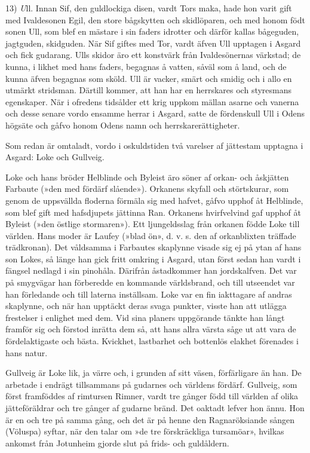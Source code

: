 13) {\emph Ull.} Innan Sif, den guldlockiga disen, vardt Tors maka, hade
hon varit gift med Ivaldesonen Egil, den store bågskytten och
skidlöparen, och med honom födt sonen Ull, som blef en mästare i sin
faders idrotter och därför kallas bågeguden, jagtguden, skidguden. När
Sif giftes med Tor, vardt äfven Ull upptagen i Asgard och fick gudarang.
Ulls skidor äro ett konstvärk från Ivaldesönernas värkstad; de
kunna, i likhet med hans faders, begagnas å vatten, såväl som å land,
och de kunna äfven begagnas som sköld. Ull är vacker, smärt och smidig
och i allo en utmärkt stridsman. Därtill kommer, att han har en
herrskares och styresmans egenskaper. När i ofredens tidsålder ett krig
uppkom mällan asarne och vanerna och desse senare vordo ensamme herrar i
Asgard, satte de fördenskull Ull i Odens högsäte och gåfvo honom Odens
namn och herrskarerättigheter.

Som redan är omtaladt, vordo i oskuldstiden två varelser af jättestam
upptagna i Asgard: Loke och Gullveig.

Loke och hans bröder Helblinde och Byleist äro söner af orkan- och
åskjätten Farbaute (»den med fördärf slående»). Orkanens skyfall och
störtskurar, som genom de uppsvällda floderna förmäla sig med hafvet,
gåfvo upphof åt Helblinde, som blef gift med hafsdjupets jättinna Ran.
Orkanens hvirfvelvind gaf upphof åt Byleist (»den östlige stormaren»).
Ett ljungeldsslag från orkanen födde Loke till världen. Hans moder är
Laufey (»blad ön», d. v. s. den af orkanblixten träffade trädkronan).
Det våldsamma i Farbautes skaplynne visade sig ej på ytan af hans son
Lokes, så länge han gick fritt omkring i Asgard, utan först sedan han
vardt i fängsel nedlagd i sin pinohåla. Därifrån åstadkommer han
jordskalfven. Det var på smygvägar han förberedde en kommande
världsbrand, och till utseendet var han förledande och till laterna
inställsam. Loke var en fin iakttagare af andras skaplynne, och när han
upptäckt deras svaga punkter, visste han att utlägga frestelser i
enlighet med dem. Vid sina planers uppgörande tänkte han långt framför
sig och förstod inrätta dem så, att hans allra värsta såge ut att vara
de fördelaktigaste och bästa. Kvickhet, lastbarhet och bottenlös elakhet
förenades i hans natur.

Gullveig är Loke lik, ja värre och, i grunden af sitt väsen,
förfärligare än han. De arbetade i endrägt tillsammans på gudarnes och
världens fördärf. Gullveig, som först framföddes af rimtursen Rimner,
vardt tre gånger född till världen af olika jätteföräldrar och tre
gånger af gudarne bränd. Det
oaktadt lefver hon ännu. Hon är en och tre på samma gång, och det är på
henne den Ragnaröksiande sången (Völuspa) syftar, när den talar om »de
tre förskräckliga tursamöar», hvilkas ankomst från Jotunheim gjorde slut
på frids- och guldåldern.


